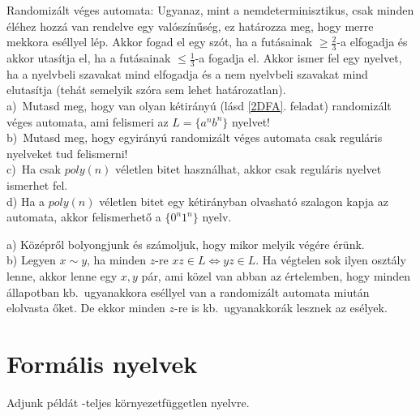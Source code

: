 	
\begin{Exercise}[counter={sorszam}, difficulty=0] 	Randomizált véges automata: Ugyanaz, mint a nemdeterminisztikus, csak minden éléhez hozz\'a van rendelve egy valószínűség, ez határozza meg, hogy merre mekkora eséllyel lép. Akkor fogad el egy szót, ha a futásainak $\ge\frac{2}{3}$-a elfogadja és akkor utasítja el, ha a futásainak $\le\frac{1}{3}$-a fogadja el. Akkor ismer fel egy nyelvet, ha a nyelvbeli szavakat mind elfogadja és a nem nyelvbeli szavakat mind elutasítja (tehát semelyik szóra sem lehet határozatlan).\\
	a)~\hard Mutasd meg, hogy van olyan kétirányú (l\'asd \ref{2DFA}. feladat) randomizált véges automata, ami felismeri az $L=\{a^nb^n\}$ nyelvet!\\
	b)~\veryhard Mutasd meg, hogy egyirányú randomizált véges automata csak reguláris nyelveket tud felismerni!\\
	c)~\veryhard Ha csak $poly(n)$ v\'eletlen bitet haszn\'alhat, akkor csak reguláris nyelvet ismerhet fel.\\
	d) Ha a $poly(n)$ v\'eletlen bitet egy k\'etir\'anyban olvashat\'o szalagon kapja az automata, akkor felismerhető a $\{0^n1^n\}$ nyelv.	
\end{Exercise}
\begin{Answer}
	a) K\"oz\'epr\H ol bolyongjunk \'es sz\'amoljuk, hogy mikor melyik v\'eg\'ere \'er\"unk.\\
	b) Legyen $x\sim y$, ha minden $z$-re $xz\in L \Leftrightarrow yz\in L$. Ha v\'egtelen sok ilyen oszt\'aly lenne, akkor lenne egy $x,y$ p\'ar, ami k\"ozel van abban az \'ertelemben, hogy minden \'allapotban kb.\ ugyanakkora es\'ellyel van a randomiz\'alt automata miut\'an elolvasta \H oket. De ekkor minden $z$-re is kb.\ ugyanakkor\'ak lesznek az es\'elyek.
\end{Answer}

\section{Form\'alis nyelvek}


\begin{Exercise}[counter={sorszam}, difficulty=1]
	Adjunk példát \NL-teljes környezetfüggetlen nyelvre. 
\end{Exercise}


